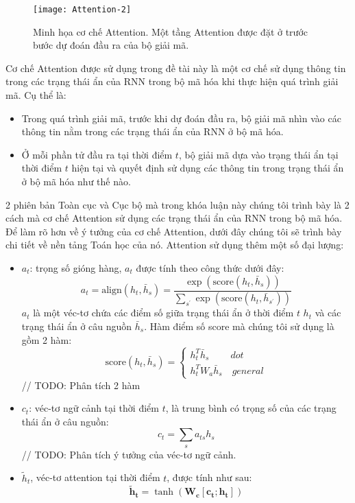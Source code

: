 \begin{figure}
	\centering
	\texttt{[image: Attention-2]}
	\caption[Minh họa cơ chế Attention.]{Minh họa cơ chế Attention. Một tầng Attention được đặt ở trước bước dự đoán đầu ra của bộ giải mã.}
	\label{fig_Attention}
\end{figure}
Cơ chế Attention được sử dụng trong đề tài này là một cơ chế sử dụng thông tin trong các trạng thái ẩn của RNN trong bộ mã hóa khi thực hiện quá trình giải mã. Cụ thể là:
\begin{itemize}
	\item Trong quá trình giải mã, trước khi dự đoán đầu ra, bộ giải mã nhìn vào các thông tin nằm trong các trạng thái ẩn của RNN ở bộ mã hóa.
	\item Ở mỗi phần tử đầu ra tại thời điểm $t$, bộ giải mã dựa vào trạng thái ẩn tại thời điểm $t$ hiện tại và quyết định sử dụng các thông tin trong trạng thái ẩn ở bộ mã hóa như thế nào.
\end{itemize}
2 phiên bản Toàn cục và Cục bộ mà trong khóa luận này chúng tôi trình bày là 2 cách mà cơ chế Attention sử dụng các trạng thái ẩn của RNN trong bộ mã hóa.
Để làm rõ hơn về ý tưởng của cơ chế Attention, dưới đây chúng tôi sẽ trình bày chi tiết về nền tảng Toán học của nó.
Attention sử dụng thêm một số đại lượng:
\begin{itemize}
	\item $a_t$: trọng số gióng hàng, $a_t$ được tính theo công thức dưới đây:
	\begin{equation}
	a_t = \text{align}(h_t, \bar{h}_s) = \frac{\exp\left(\text{score}(h_t, \bar{h}_s)\right)}{\sum_{s^{'}}\exp\left(\text{score}(h_t, \bar{h}_{s^{'}})\right)}
	\end{equation}
	$a_t$ là một véc-tơ chứa các điểm số giữa trạng thái ẩn ở thời điểm $t$ $h_t$ và các trạng thái ẩn ở câu nguồn $\bar{h}_s$. Hàm điểm số score mà chúng tôi sử dụng là gồm 2 hàm:
	\begin{equation}
	\text{score}(h_t, \bar{h}_s) = \left\{
			\begin{array}{ll}
			h^T_t\bar{h}_s \ \quad\quad dot\\
			h^T_tW_a\bar{h}_s	\quad general
			\end{array}
		\right.
	\end{equation}
	// TODO: Phân tích 2 hàm
	\item $c_t$: véc-tơ ngữ cảnh tại thời điểm $t$, là trung bình có trọng số của các trạng thái ẩn ở câu nguồn:
	\begin{equation}
	c_t = \sum_{s}a_{ts}h_s
	\end{equation}
	// TODO: Phân tích ý tưởng của véc-tơ ngữ cảnh. 
	\item $\tilde{h}_t$, véc-tơ attention tại thời điểm $t$, được tính như sau:
	\begin{equation}
	\boldsymbol{\tilde{h}_t} = \tanh(\bm{W_c}[\bm{c_t};\bm{h_t}])
	\end{equation}
\end{itemize}
